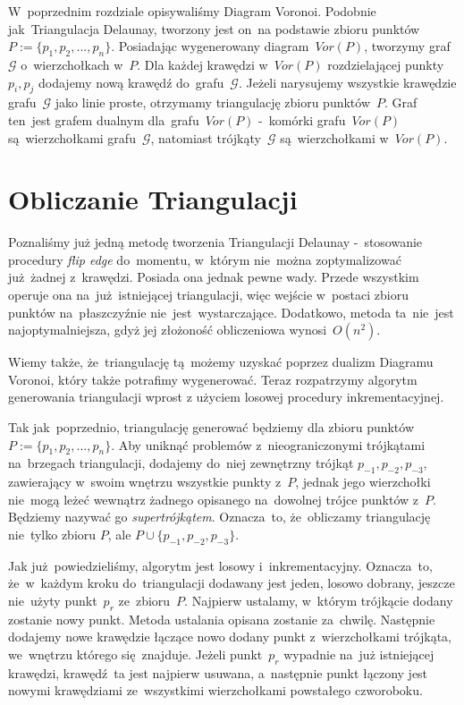 \documentclass[skorowidz,autorrok,backref,xodstep,oswiadczenie]{wmimgr}
\begin{document}
W~poprzednim rozdziale opisywaliśmy Diagram Voronoi. Podobnie jak~Triangulacja Delaunay, tworzony jest on~na podstawie zbioru punktów~$P:=\{ p_{1},p_{2},...,p_{n} \}$. Posiadając wygenerowany diagram~$Vor(P)$, tworzymy graf~$\mathcal{G}$ o~wierzchołkach w~$P$. Dla każdej krawędzi w~$Vor(P)$ rozdzielającej punkty $p_{i}, p_{j}$ dodajemy nową krawędź do~grafu~$\mathcal{G}$. Jeżeli narysujemy wszystkie krawędzie grafu~$\mathcal{G}$ jako linie proste, otrzymamy triangulację zbioru punktów~$P$. Graf ten~jest grafem dualnym dla~grafu~$Vor(P)$ -~komórki grafu~$Vor(P)$ są~wierzchołkami grafu~$\mathcal{G}$, natomiast trójkąty~$\mathcal{G}$ są~wierzchołkami w~$Vor(P)$.

\section{Obliczanie Triangulacji}

Poznaliśmy już jedną metodę tworzenia Triangulacji Delaunay -~stosowanie procedury \emph{flip edge} do~momentu, w~którym nie~można zoptymalizować już~żadnej z~krawędzi. Posiada ona jednak pewne wady. Przede wszystkim operuje ona na~już~istniejącej triangulacji, więc wejście w~postaci zbioru punktów na~płaszczyźnie nie~jest~wystarczające. Dodatkowo, metoda ta~nie~jest najoptymalniejsza, gdyż jej złożoność obliczeniowa wynosi~$O(n^2)$.

Wiemy także, że~triangulację tą~możemy uzyskać poprzez dualizm Diagramu Voronoi, który także potrafimy wygenerować. Teraz rozpatrzymy algorytm generowania triangulacji wprost z użyciem losowej procedury inkrementacyjnej.

Tak jak~poprzednio, triangulację generować będziemy dla zbioru punktów~$P:=\{ p_{1},p_{2},...,p_{n} \}$. Aby uniknąć problemów z~nieograniczonymi trójkątami na~brzegach triangulacji, dodajemy do~niej zewnętrzny trójkąt $p_{-1}, p_{-2}, p_{-3}$, zawierający w~swoim wnętrzu wszystkie punkty z~$P$, jednak jego wierzchołki nie~mogą leżeć wewnątrz żadnego opisanego na~dowolnej trójce punktów z~$P$. Będziemy nazywać go \emph{supertrójkątem}. Oznacza~to, że~obliczamy triangulację nie~tylko zbioru $P$, ale $P \cup \{p_{-1}, p_{-2}, p_{-3}\}$.

Jak już~powiedzieliśmy, algorytm jest losowy i~inkrementacyjny. Oznacza~to, że~w~każdym kroku do~triangulacji dodawany jest jeden, losowo dobrany, jeszcze nie~użyty punkt~$p_{r}$ ze~zbioru~$P$. Najpierw ustalamy, w~którym trójkącie dodany zostanie nowy punkt. Metoda ustalania opisana zostanie za~chwilę. Następnie dodajemy nowe krawędzie łączące nowo dodany punkt z~wierzchołkami trójkąta, we~wnętrzu którego się~znajduje. Jeżeli punkt~$p_{r}$ wypadnie na~już istniejącej krawędzi, krawędź~ta jest najpierw usuwana, a~następnie punkt łączony jest nowymi krawędziami ze~wszystkimi wierzchołkami powstałego czworoboku.
\end{document}

